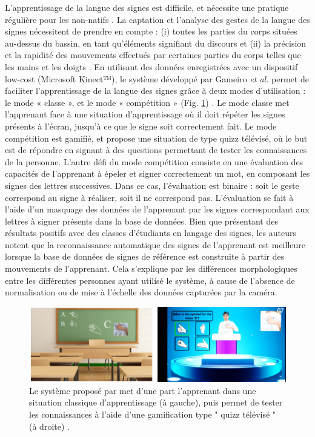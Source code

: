 L'apprentissage de la langue des signes est difficile, et nécessite une pratique régulière pour les non-natifs \parencite{Cooper2011Slr}. La captation et l'analyse des gestes de la langue des signes nécessitent de prendre en compte : (i) toutes les parties du corps situées au-dessus du bassin, en tant qu’éléments signifiant du discours et (ii) la précision et la rapidité des mouvements effectués par certaines parties du corps telles que les mains et les doigts \parencite{Gibet2016IEi}. En utilisant des données enregistrées avec un dispositif low-cost (Microsoft Kinect™), le système développé par Gameiro \textit{et al.} permet de faciliter l'apprentissage de la langue des signes grâce à deux modes d'utilisation : le mode « classe », et le mode « compétition » (Fig. \ref{fig:eiah_gameiro}) \parencite{Gameiro2014KST}. Le mode classe met l'apprenant face à une situation d'apprentissage où il doit répéter les signes présents à l'écran, jusqu'à ce que le signe soit correctement fait. Le mode compétition est gamifié, et propose une situation de type quizz télévisé, où le but est de répondre en signant à des questions permettant de tester les connaissances de la personne. L'autre défi du mode compétition consiste en une évaluation des capacités de l'apprenant à épeler et signer correctement un mot, en composant les signes des lettres successives. Dans ce cas, l'évaluation est binaire : soit le geste correspond au signe à réaliser, soit il ne correspond pas. L'évaluation se fait à l'aide d'un masquage des données de l'apprenant par les signes correspondant aux lettres à signer présents dans la base de données. Bien que présentant des résultats positifs avec des classes d'étudiants en langage des signes, les auteurs notent que la reconnaissance automatique des signes de l'apprenant est meilleure lorsque la base de données de signes de référence est construite à partir des mouvements de l'apprenant. Cela s'explique par les différences morphologiques entre les différentes personnes ayant utilisé le système, à cause de l'absence de normalisation ou de mise à l'échelle des données capturées par la caméra.

\begin{figure}
    \centering
    \includegraphics[width=\textwidth]{pictures/eiah_gameiro.png}
    \caption[EIAH pour l'apprentissage de la langue des signes \parencite{Gameiro2014KST}]{Le système proposé par \parencite{Gameiro2014KST} met d'une part l'apprenant dans une situation classique d'apprentissage (à gauche), puis permet de tester les connaissances à l'aide d'une gamification type " quizz télévisé " (à droite) \parencite{Gameiro2014KST}.}
    \label{fig:eiah_gameiro}
\end{figure}

